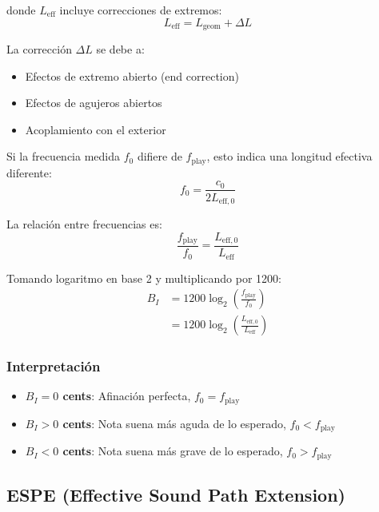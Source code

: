 \documentclass[12pt,a4paper,twocolumn]{article}
\newcommand{\freqzero}{f_0}
\newcommand{\freqplay}{f_{\text{play}}}
\begin{document}
donde $L_{\text{eff}}$ incluye correcciones de extremos:
\begin{equation}
L_{\text{eff}} = L_{\text{geom}} + \Delta L
\label{eq:longitud_efectiva}
\end{equation}

La corrección $\Delta L$ se debe a:
\begin{itemize}
    \item Efectos de extremo abierto (end correction)
    \item Efectos de agujeros abiertos
    \item Acoplamiento con el exterior
\end{itemize}

Si la frecuencia medida $\freqzero$ difiere de $\freqplay$, esto indica una longitud efectiva diferente:
\begin{equation}
\freqzero = \frac{c_0}{2 L_{\text{eff},0}}
\label{eq:freq_medida}
\end{equation}

La relación entre frecuencias es:
\begin{equation}
\frac{\freqplay}{\freqzero} = \frac{L_{\text{eff},0}}{L_{\text{eff}}}
\label{eq:relacion_frecuencias}
\end{equation}

Tomando logaritmo en base 2 y multiplicando por 1200:
\begin{align}
B_I &= 1200 \log_2\left(\frac{\freqplay}{\freqzero}\right) \\
&= 1200 \log_2\left(\frac{L_{\text{eff},0}}{L_{\text{eff}}}\right)
\label{eq:bi_deriv}
\end{align}

\subsubsection{Interpretación}

\begin{itemize}
    \item \textbf{$B_I = 0$ cents}: Afinación perfecta, $\freqzero = \freqplay$
    \item \textbf{$B_I > 0$ cents}: Nota suena más aguda de lo esperado, $\freqzero < \freqplay$
    \item \textbf{$B_I < 0$ cents}: Nota suena más grave de lo esperado, $\freqzero > \freqplay$
\end{itemize}

\subsection{ESPE (Effective Sound Path Extension)}
\end{document}
